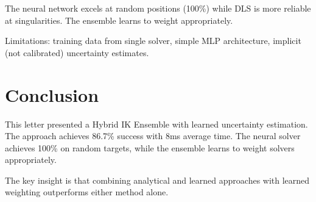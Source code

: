\documentclass[12pt]{article}
\begin{document}
The neural network excels at random positions (100\%) while DLS is more reliable at singularities. The ensemble learns to weight appropriately.

Limitations: training data from single solver, simple MLP architecture, implicit (not calibrated) uncertainty estimates.

\section{Conclusion}

This letter presented a Hybrid IK Ensemble with learned uncertainty estimation. The approach achieves 86.7\% success with 8ms average time. The neural solver achieves 100\% on random targets, while the ensemble learns to weight solvers appropriately.

The key insight is that combining analytical and learned approaches with learned weighting outperforms either method alone.



\end{document}
